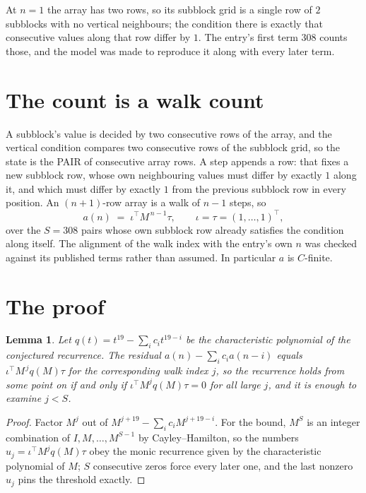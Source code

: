 \documentclass[11pt,a4paper]{article}
\theoremstyle{plain}
\newtheorem{lemma}[theorem]{Lemma}
\theoremstyle{definition}
\begin{document}
At $n=1$ the array has two rows, so its subblock grid is a single row of $2$ subblocks with
no vertical neighbours; the condition there is exactly that consecutive values along that row
differ by $1$. The entry's first term $308$ counts those, and the model was made to
reproduce it along with every later term.

\section{The count is a walk count}

A subblock's value is decided by two consecutive rows of the array, and the
vertical condition compares two consecutive rows of the subblock grid, so the state is the
PAIR of consecutive array rows. A step appends a row: that fixes a new subblock row, whose own
neighbouring values must differ by exactly $1$ along it, and which must differ by exactly
$1$ from the previous subblock row in every position. An $(n+1)$-row array is a walk of
$n-1$ steps, so
\[
a(n)\;=\;\iota^{\!\top}M^{\,n-1}\tau,\qquad\iota=\tau=(1,\dots,1)^{\!\top},
\]
over the $S=308$ pairs whose own subblock row already satisfies the condition along itself.
The alignment of the walk index with the entry's own $n$ was checked against its published
terms rather than assumed. In particular $a$ is $C$-finite.

\section{The proof}

\begin{lemma}\label{lem:crit}
Let $q(t)=t^{19}-\sum_i c_it^{19-i}$ be the characteristic polynomial of the
conjectured recurrence. The residual $a(n)-\sum_ic_ia(n-i)$ equals
$\iota^{\!\top}M^{\,j}q(M)\tau$ for the corresponding walk index $j$, so the recurrence
holds from some point on if and only if $\iota^{\!\top}M^{j}q(M)\tau=0$ for all large $j$,
and it is enough to examine $j<S$.
\end{lemma}

\begin{proof}
Factor $M^{j}$ out of $M^{j+19}-\sum_ic_iM^{j+19-i}$. For the bound, $M^{S}$
is an integer combination of $I,M,\dots,M^{S-1}$ by Cayley--Hamilton, so the numbers
$u_j=\iota^{\!\top}M^{j}q(M)\tau$ obey the monic recurrence given by the characteristic
polynomial of $M$; $S$ consecutive zeros force every later one, and the last nonzero $u_j$
pins the threshold exactly.
\end{proof}
\end{document}
